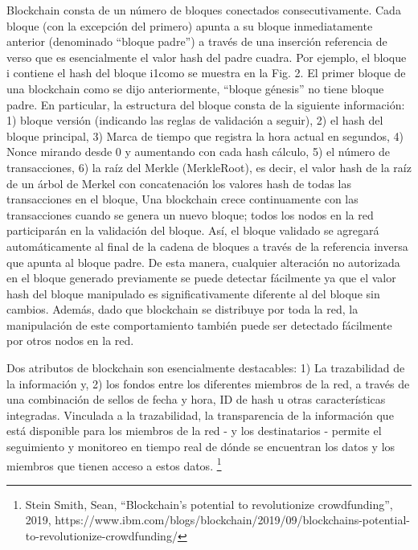 \documentclass[12pt]{report} %
\begin{document}
Blockchain consta de un número de bloques conectados consecutivamente. Cada bloque (con la excepción del primero) apunta a su bloque inmediatamente anterior (denominado “bloque padre”) a través de una inserción referencia de verso que es esencialmente el valor hash del padre cuadra. Por ejemplo, el bloque i contiene el hash del bloque i1como se muestra en la Fig. 2. El primer bloque de una blockchain como se dijo anteriormente, “bloque génesis” no tiene bloque padre. En particular, la estructura del bloque consta de la siguiente información: 1) bloque versión (indicando las reglas de validación a seguir), 2) el hash del bloque principal, 3) Marca de tiempo que registra la hora actual en segundos, 4) Nonce mirando desde 0 y aumentando con cada hash cálculo, 5) el número de transacciones, 6) la raíz del Merkle (MerkleRoot), es decir, el valor hash de la raíz de un árbol de Merkel con concatenación los valores hash de todas las transacciones en el bloque, Una blockchain crece continuamente con las transacciones cuando se genera un nuevo bloque; todos los nodos en la red participarán en la validación del bloque. Así, el bloque validado se agregará automáticamente al final de la cadena de bloques a través de la referencia inversa que apunta al bloque padre. De esta manera, cualquier alteración no autorizada en el bloque generado previamente se puede detectar fácilmente ya que el valor hash del bloque manipulado es significativamente diferente al del bloque sin cambios. Además, dado que blockchain se distribuye por toda la red, la manipulación de este comportamiento también puede ser detectado fácilmente por otros nodos en la red.

Dos atributos de blockchain son esencialmente destacables: 1) La trazabilidad de la información y, 2) los fondos entre los diferentes miembros de la red, a través de una combinación de sellos de fecha y hora, ID de hash u otras características integradas. Vinculada a la trazabilidad, la transparencia de la información que está disponible para los miembros de la red - y los destinatarios - permite el seguimiento y monitoreo en tiempo real de dónde se encuentran los datos y los miembros que tienen acceso a estos datos. \footnote{Stein Smith, Sean, “Blockchain’s potential to revolutionize crowdfunding”, 2019, https://www.ibm.com/blogs/blockchain/2019/09/blockchains-potential-to-revolutionize-crowdfunding/}
\end{document}
